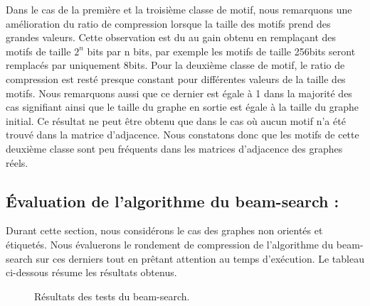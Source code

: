 	Dans le cas de la première et la troisième classe de motif, nous remarquons une amélioration du ratio de compression lorsque la taille des motifs prend des grandes valeurs. Cette observation est du au gain obtenu en remplaçant des motifs de taille $2^n$ bits par n bits, par exemple les motifs de taille 256bits seront remplacés par uniquement 8bits. Pour la deuxième classe de motif, le ratio de compression est resté presque constant pour différentes valeurs de la taille des motifs. Nous remarquons aussi que ce dernier est égale à 1 dans la majorité des cas signifiant ainsi que le taille du graphe en sortie est égale à la taille du graphe initial. Ce résultat ne peut être obtenu que dans le cas où aucun motif n'a été trouvé dans la matrice d'adjacence. Nous constatons donc que les motifs de cette deuxième classe sont peu fréquents dans les matrices d'adjacence des graphes réels. 
	
	
	
	
	\subsection{Évaluation de l'algorithme du beam-search :}
	
  Durant cette section, nous considérons le cas des graphes non orientés et étiquetés. Nous évaluerons le rondement de compression de l'algorithme du beam-search sur ces derniers tout en prêtant attention au temps d'exécution. Le tableau ci-dessous résume les résultats obtenus.
  

	\begin{figure}[H]
		\begin{center}
			\hspace{3em}
			\hspace{3em}
			
			\caption{Résultats des tests du beam-search.}
			\label{fig:test-beam}
		\end{center}
	\end{figure}
	

